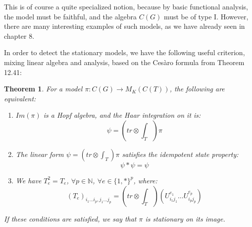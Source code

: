 \documentclass[12pt]{amsbook}
\newtheorem{theorem}{Theorem}[chapter]
\begin{document}
This is of course a quite specialized notion, because by basic functional analysis, the model must be faithful, and the algebra $C(G)$ must be of type I. However, there are many interesting examples of such models, as we have already seen in chapter 8.

\bigskip

In order to detect the stationary models, we have the following useful criterion, mixing linear algebra and analysis, based on the Ces\`aro formula from Theorem 12.41:


\begin{theorem}
For a model $\pi:C(G)\to M_K(C(T))$, the following are equivalent:
\begin{enumerate}
\item $Im(\pi)$ is a Hopf algebra, and the Haar integration on it is:
$$\psi=\left(tr\otimes\int_T\right)\pi$$

\item The linear form $\psi=(tr\otimes\int_T)\pi$ satisfies the idempotent state property:
$$\psi*\psi=\psi$$

\item We have $T_e^2=T_e$, $\forall p\in\mathbb N$, $\forall e\in\{1,*\}^p$, where:
$$(T_e)_{i_1\ldots i_p,j_1\ldots j_p}=\left(tr\otimes\int_T\right)(U_{i_1j_1}^{e_1}\ldots U_{i_pj_p}^{e_p})$$
\end{enumerate}
If these conditions are satisfied, we say that $\pi$ is stationary on its image.
\end{theorem}
\end{document}
